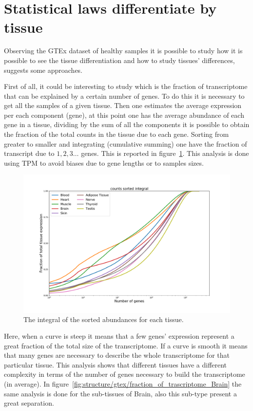 \section{Statistical laws differentiate by tissue}
Observing the GTEx dataset of healthy samples it is possible to study how it is possible to see the tissue differentiation and how to study tissues' differences,~\cite{mele2014} suggests some approaches.

First of all, it could be interesting to study which is the fraction of transcriptome that can be explained by a certain number of genes.
To do this it is necessary to get all the samples of a given tissue. Then one estimates the average expression per each component (gene), at this point one has the average abundance of each gene in a tissue, dividing by the sum of all the components it is possible to obtain the fraction of the total counts in the tissue due to each gene. Sorting from greater to smaller and integrating (cumulative summing) one have the fraction of transcript due to $1, 2, 3\dots$ genes. This is reported in figure~\ref{fig:structure/gtex/fraction_of_trascriptome}. This analysis is done using TPM to avoid biases due to gene lengths or to samples sizes.
\begin{figure}[htb!]
  \centering
  \includegraphics[width=0.7\linewidth]{pictures/structure/gtex/fraction_of_trascriptome.pdf}
  \caption{The integral of the sorted abundances for each tissue.}
  \label{fig:structure/gtex/fraction_of_trascriptome}
\end{figure}
Here, when a curve is steep it means that a few genes' expression represent a great fraction of the total size of the transcriptome. If a curve is smooth it means that many genes are necessary to describe the whole transcriptome for that particular tissue. This analysis shows that different tissues have a different complexity in terms of the number of genes necessary to build the transcriptome (in average). In figure~\ref{fig:structure/gtex/fraction_of_trascriptome_Brain} the same analysis is done for the sub-tissues of Brain, also this sub-type present a great separation.
